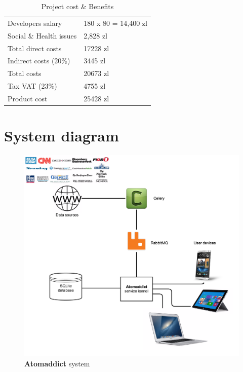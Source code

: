 \documentclass[12pt]{article}
\begin{document}
\begin{table}[H]
\centering
    \begin{tabular}{p{5cm}p{9cm}}  \hline
    \rowcolor{blue!20!black!30!cyan}\multicolumn{2}{|c|}{\textbf{Project cost \& Benefits}} \\ \hline \hline
    
    Developers salary               & 180 x 80 = 14,400 zl    \\ \hline
    Social \& Health issues         & 2,828 zl      \\ \hline
    Total direct costs              & 17228 zl    \\ \hline
    Indirect costs (20\%)           & 3445 zl    \\ \hline
    Total costs                     & 20673 zl    \\ \hline
    Tax VAT (23\%)                  & 4755 zl    \\ \hline
    Product cost              & 25428 zl    \\ \hline

    \end{tabular}
    \caption{Project cost \& Benefits}
\end{table}


\section{System diagram}

\begin{figure}[H]
    \centering
    \includegraphics[width=\textwidth]{images/systemDiagram.png}
    \caption{\textbf{Atomaddict} system}
    \label{fig:system}
\end{figure}
\end{document}
